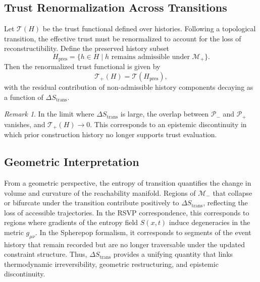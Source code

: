 \documentclass[12pt]{article}
\theoremstyle{plain}
\theoremstyle{definition}
\theoremstyle{remark}
\newtheorem{remark}[theorem]{Remark}
\begin{document}
\subsection{Trust Renormalization Across Transitions}

Let $\mathcal{T}(H)$ be the trust functional defined over histories. Following a topological transition, the effective trust must be renormalized to account for the loss of reconstructibility. Define the preserved history subset
\[
H_{\mathrm{pres}} = \{ h \in H \mid h \text{ remains admissible under } \mathcal{M}_+ \}.
\]
Then the renormalized trust functional is given by
\[
\mathcal{T}_+(H) = \mathcal{T}(H_{\mathrm{pres}}),
\]
with the residual contribution of non-admissible history components decaying as a function of $\Delta S_{\mathrm{trans}}$.

\begin{remark}
In the limit where $\Delta S_{\mathrm{trans}}$ is large, the overlap between $\mathcal{P}_-$ and $\mathcal{P}_+$ vanishes, and $\mathcal{T}_+(H) \to 0$. This corresponds to an epistemic discontinuity in which prior construction history no longer supports trust evaluation.
\end{remark}

\subsection{Geometric Interpretation}

From a geometric perspective, the entropy of transition quantifies the change in volume and curvature of the reachability manifold. Regions of $\mathcal{M}_-$ that collapse or bifurcate under the transition contribute positively to $\Delta S_{\mathrm{trans}}$, reflecting the loss of accessible trajectories. In the RSVP correspondence, this corresponds to regions where gradients of the entropy field $S(x,t)$ induce degeneracies in the metric $g_{\mu\nu}$. In the Spherepop formalism, it corresponds to segments of the event history that remain recorded but are no longer traversable under the updated constraint structure. Thus, $\Delta S_{\mathrm{trans}}$ provides a unifying quantity that links thermodynamic irreversibility, geometric restructuring, and epistemic discontinuity.
\end{document}
